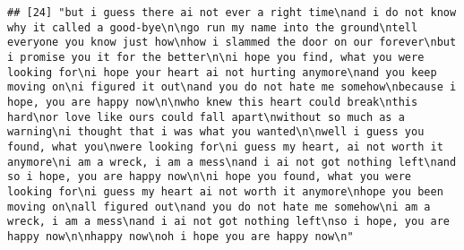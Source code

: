 \documentclass[]{article}
\begin{document}
\begin{verbatim}
## [24] "but i guess there ai not ever a right time\nand i do not know why it called a good-bye\n\ngo run my name into the ground\ntell everyone you know just how\nhow i slammed the door on our forever\nbut i promise you it for the better\n\ni hope you find, what you were looking for\ni hope your heart ai not hurting anymore\nand you keep moving on\ni figured it out\nand you do not hate me somehow\nbecause i hope, you are happy now\n\nwho knew this heart could break\nthis hard\nor love like ours could fall apart\nwithout so much as a warning\ni thought that i was what you wanted\n\nwell i guess you found, what you\nwere looking for\ni guess my heart, ai not worth it anymore\ni am a wreck, i am a mess\nand i ai not got nothing left\nand so i hope, you are happy now\n\ni hope you found, what you were looking for\ni guess my heart ai not worth it anymore\nhope you been moving on\nall figured out\nand you do not hate me somehow\ni am a wreck, i am a mess\nand i ai not got nothing left\nso i hope, you are happy now\n\nhappy now\noh i hope you are happy now\n"                                                                                                                                                                                                                                                                                                                                                                                                                                                                                                                                                                                                                                                                                                                                                                                                                                                                                                                                                                                                                                                                                                                                                                                                                                                                                                                                                                                                                                                                                                                                                                                                                                                                                                                                                                                                                                                                             

\end{verbatim}
\end{document}
